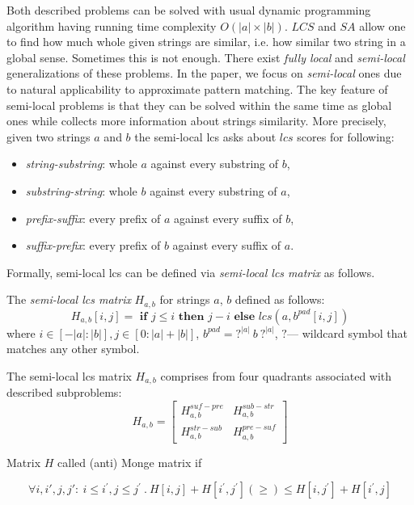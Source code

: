 Both described problems can be solved with usual dynamic programming algorithm having running time complexity $O(|a|\times|b|)$.
$LCS$ and $SA$ allow one to find how much whole given strings are similar, i.e. how similar two string in a global sense.
Sometimes this is not enough.
There exist \emph{fully local} and \emph{semi-local} generalizations of these problems.
In the paper, we focus on \emph{semi-local} ones due to natural applicability to approximate pattern matching.
The key feature of semi-local problems is that they can be solved within the same time as global ones while collects more information about strings similarity.
More precisely, given two strings $a$ and $b$ the semi-local lcs asks about $lcs$ scores for following:
\begin{itemize}
\item \emph{string-substring}: whole $a$ against every substring of $b$,
\item \emph{substring-string}: whole $b$ against every substring of $a$,
\item \emph{prefix-suffix}: every prefix of $a$ against every suffix of $b$,
\item \emph{suffix-prefix}: every prefix of $b$ against every suffix of $a$.
\end{itemize} 
Formally, semi-local lcs can be defined via \emph{semi-local lcs matrix} as follows.
\begin{definition}
The \emph{semi-local lcs matrix}  $H_{a,b}$ for strings $a$, $b$ defined as follows:
\begin{equation}
  H_{a,b}[i,j] = \textbf{ if } j\leq i \textbf{ then } j-i \textbf{ else } lcs(a,b^{pad}[i,j]) 
\end{equation} 
where $i \in [-|a|:|b|], j \in [0:|a|+|b|] $, $b^{pad}= ?^{|a|}\ b\ ?^{|a|}$, $?$--- wildcard symbol that matches any other symbol.
\end{definition}
The semi-local lcs matrix $H_{a,b}$ comprises from four quadrants associated with described subproblems:
\begin{equation}
  H_{a,b} = \begin{bmatrix}
    H_{a,b}^{suf-pre} & H_{a,b}^{sub-str} \\
    H_{a,b}^{str-sub} & H_{a,b}^{pre-suf} 
  \end{bmatrix}    
\end{equation}

\begin{definition}
Matrix $H$ called (anti) Monge matrix if

\begin{displaymath}
  \forall i,i',j,j':\ i\leq i^{'}, j \leq j^{'}\ .\ H[i,j]+H[i^{'},j^{'}] (\geq)\leq H[i,j^{'}]+H[i^{'},j]
\end{displaymath}
\end{definition}

